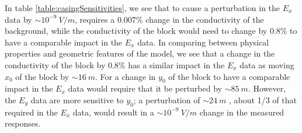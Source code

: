 In table \ref{table:casingSensitivities}, we see that to cause a perturbation
in the $E_x$ data by $\sim10^{-9}~V/m$, requires a 0.007\% change in the
conductivity of the background, while the conductivity of the block would need
to change by 0.8\% to have a comparable impact in the $E_x$ data.
In comparing between physical properties and geometric features of the model,
we see that a change in the conductivity of
the block by 0.8\% has a similar impact in the $E_x$ data
as moving $x_0$ of the block by $\sim16~m$. For a change in $y_0$ of the block
to have a comparable impact in the $E_x$ data would require that it be perturbed by
$\sim85~m$. However, the $E_y$ data are more sensitive to $y_0$; a perturbation of $\sim24~m$
, about 1/3 of that required in the $E_x$ data, would result in a $\sim10^{-9}~V/m$ change in the
measured responses.

